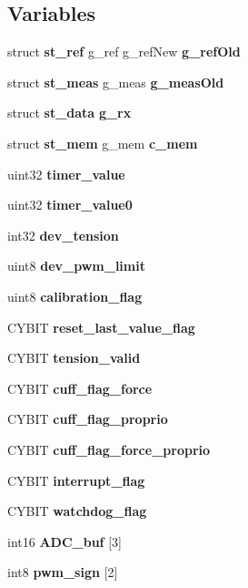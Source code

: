 \subsection*{Variables}
\begin{DoxyCompactItemize}
\item 
\mbox{\label{globals_8c_a158d26b6d15050b37d8039881d75e0dc}} 
struct \textbf{ st\+\_\+ref} g\+\_\+ref g\+\_\+ref\+New {\bfseries g\+\_\+ref\+Old}
\item 
\mbox{\label{globals_8c_a47c3980e6bddec492ca4315e36602ba0}} 
struct \textbf{ st\+\_\+meas} g\+\_\+meas {\bfseries g\+\_\+meas\+Old}
\item 
\mbox{\label{globals_8c_aa963ce8fafc11e104eb7ee22982d0345}} 
struct \textbf{ st\+\_\+data} {\bfseries g\+\_\+rx}
\item 
\mbox{\label{globals_8c_a44c3cbd8e234e0816f0334e29646a800}} 
struct \textbf{ st\+\_\+mem} g\+\_\+mem {\bfseries c\+\_\+mem}
\item 
\mbox{\label{globals_8c_ad47cd0e4d0fcf5739a88e52e949a8084}} 
uint32 {\bfseries timer\+\_\+value}
\item 
\mbox{\label{globals_8c_a9bab7f1b1cf2ba38d5968eee42644c32}} 
uint32 {\bfseries timer\+\_\+value0}
\item 
\mbox{\label{globals_8c_a53a494e9edc739a4f7c884778d1a93b1}} 
int32 {\bfseries dev\+\_\+tension}
\item 
\mbox{\label{globals_8c_a21f4f67e4203dea0b9956589eaa6cef3}} 
uint8 {\bfseries dev\+\_\+pwm\+\_\+limit}
\item 
\mbox{\label{globals_8c_afa36d7a54495dfdb796684539bf041a5}} 
uint8 {\bfseries calibration\+\_\+flag}
\item 
\mbox{\label{globals_8c_aa89a782cfe75ce7970236babd308fe69}} 
C\+Y\+B\+IT {\bfseries reset\+\_\+last\+\_\+value\+\_\+flag}
\item 
\mbox{\label{globals_8c_ac42fa606610c2600210d9b7b2c1d0882}} 
C\+Y\+B\+IT {\bfseries tension\+\_\+valid}
\item 
\mbox{\label{globals_8c_ad803de4e42018492c5cb752ac3dcbe42}} 
C\+Y\+B\+IT {\bfseries cuff\+\_\+flag\+\_\+force}
\item 
\mbox{\label{globals_8c_aa19d181c86248b8e1fb82116066b0de7}} 
C\+Y\+B\+IT {\bfseries cuff\+\_\+flag\+\_\+proprio}
\item 
\mbox{\label{globals_8c_a0689d0713bff42f38351bb3358da6aac}} 
C\+Y\+B\+IT {\bfseries cuff\+\_\+flag\+\_\+force\+\_\+proprio}
\item 
\mbox{\label{globals_8c_a1e6fda88dfdabc63859f8907eb702920}} 
C\+Y\+B\+IT {\bfseries interrupt\+\_\+flag}
\item 
\mbox{\label{globals_8c_a156a860c465529ff2f515725ab816a58}} 
C\+Y\+B\+IT {\bfseries watchdog\+\_\+flag}
\item 
\mbox{\label{globals_8c_aed6b2ae513eb1fdb1dcfb2e8191dbfdd}} 
int16 {\bfseries A\+D\+C\+\_\+buf} [3]
\item 
\mbox{\label{globals_8c_a581fe1be8b8832dd9b5bc74d6cd8cfbd}} 
int8 {\bfseries pwm\+\_\+sign} [2]
\end{DoxyCompactItemize}


